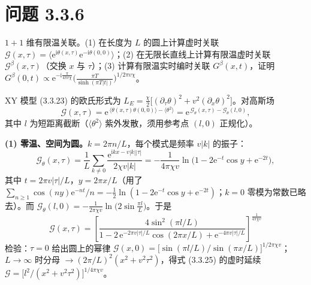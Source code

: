 \section*{问题 3.3.6}
\begin{problem}
$1+1$ 维有限温关联。(1) 在长度为 $L$ 的圆上计算虚时关联 $\mathcal{G}(x,\tau)=\langle\mathrm{e}^{\mathrm{i}\theta(x,\tau)}\mathrm{e}^{-\mathrm{i}\theta(0,0)}\rangle$；(2) 在无限长直线上计算有限温虚时关联 $\mathcal{G}^{\beta}(x,\tau)$（交换 $x$ 与 $\tau$）；(3) 计算有限温实时编时关联 $G^{\beta}(x,t)$，证明 $G^{\beta}(0,t)\propto\mathrm{e}^{-\mathrm{i}\frac{\pi}{4\pi v\chi}}\big(\frac{\pi T}{\sinh(\pi T|t|)}\big)^{1/2\pi v\chi}$。
\end{problem}
\solution

XY 模型 (3.3.23) 的欧氏形式为 $L_E=\frac{\chi}{2}\big[(\partial_\tau\theta)^{2}+v^{2}(\partial_x\theta)^{2}\big]$。对高斯场
\begin{equation*}
\mathcal{G}(x,\tau)=\mathrm{e}^{\,\langle\theta(x,\tau)\theta(0,0)\rangle-\langle\theta^{2}\rangle}
=\mathrm{e}^{\,\mathcal{G}_\theta(x,\tau)-\mathcal{G}_\theta(l,0)} ,
\end{equation*}
其中 $l$ 为短距离截断（$\langle\theta^{2}\rangle$ 紫外发散，须用参考点 $(l,0)$ 正规化）。

\textbf{(1) 零温、空间为圆。}$k=2\pi n/L$，每个模式是频率 $v|k|$ 的振子：
\begin{equation*}
\mathcal{G}_\theta(x,\tau)
=\frac{1}{L}\sum_{k\neq0}\frac{\mathrm{e}^{\mathrm{i}kx-v|k||\tau|}}{2\chi v|k|}
=-\frac{1}{4\pi\chi v}\ln\!\big(1-2\mathrm{e}^{-t}\cos y+\mathrm{e}^{-2t}\big),
\end{equation*}
其中 $t=2\pi v|\tau|/L$，$y=2\pi x/L$（用了 $\sum_{n\ge1}\cos(ny)\mathrm{e}^{-nt}/n=-\frac12\ln(1-2\mathrm{e}^{-t}\cos y+\mathrm{e}^{-2t})$；$k=0$ 零模为常数已略去）。而 $\mathcal{G}_\theta(l,0)=-\frac{1}{2\pi\chi v}\ln\!\big(2\sin\frac{\pi l}{L}\big)$。于是
\begin{equation*}
\boxed{\;\mathcal{G}(x,\tau)=
\left[\frac{4\sin^{2}(\pi l/L)}
{1-2\,\mathrm{e}^{-2\pi v|\tau|/L}\cos(2\pi x/L)+\mathrm{e}^{-4\pi v|\tau|/L}}\right]^{\frac{1}{4\pi\chi v}}\;}
\end{equation*}
检验：$\tau=0$ 给出圆上的幂律 $\mathcal{G}(x,0)=\big[\sin(\pi l/L)/\sin(\pi x/L)\big]^{1/2\pi\chi v}$；$L\to\infty$ 时分母 $\to(2\pi/L)^{2}(x^{2}+v^{2}\tau^{2})$，得式 (3.3.25) 的虚时延续 $\mathcal{G}=\big[l^{2}/(x^{2}+v^{2}\tau^{2})\big]^{1/4\pi\chi v}$。

